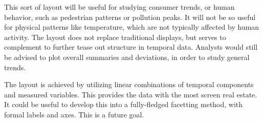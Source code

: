 \documentclass[article]{jss}
\theoremstyle{definition}
\theoremstyle{definition}
\theoremstyle{remark}
\begin{document}
This sort of layout will be useful for studying consumer trends, or
human behavior, such as pedestrian patterns or pollution peaks. It will
not be so useful for physical patterns like temperature, which are not
typically affected by human activity. The layout does not replace
traditional displays, but serves to complement to further tease out
structure in temporal data. Analysts would still be advised to plot
overall summaries and deviations, in order to study general trends.

The layout is achieved by utilizing linear combinations of temporal
components and measured variables. This provides the data with the most
screen real estate. It could be useful to develop this into a
fully-fledged facetting method, with formal labels and axes. This is a
future goal.


\end{document}
